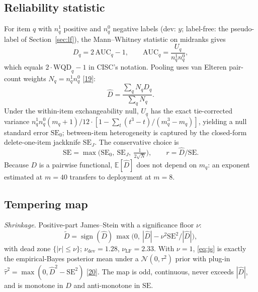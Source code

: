 \documentclass[conference]{IEEEtran}
\newcommand{\Dhat}{\widehat{D}}
\newcommand{\sign}{\operatorname{sign}}
\begin{document}
\subsection{Reliability statistic}
For item $q$ with $n^1_q$ positive and $n^0_q$ negative labels (dev: $y$; label-free: the pseudo-label of Section~\ref{sec:lf}), the Mann--Whitney statistic on midranks gives
\begin{equation}
D_q = 2\,\mathrm{AUC}_q-1,\qquad \mathrm{AUC}_q=\frac{U_q}{n^1_q n^0_q},
\end{equation}
which equals $2\cdot\mathrm{WQD}_q-1$ in CISC's notation. Pooling uses van Elteren pair-count weights $N_q=n^1_q n^0_q$ [\hyperlink{bib:vanelteren1960}{19}]:
\hypertarget{eq:pooled}{\,}
\begin{equation}
\Dhat=\frac{\sum_q N_q D_q}{\sum_q N_q}.
\end{equation}
Under the within-item exchangeability null, $U_q$ has the exact tie-corrected variance $n^1_qn^0_q(m_q{+}1)/12\cdot[1-\sum_t(t^3-t)/(m_q^3-m_q)]$, yielding a null standard error $\mathrm{SE}_0$; between-item heterogeneity is captured by the closed-form delete-one-item jackknife $\mathrm{SE}_J$. The conservative choice is
\begin{equation}
\mathrm{SE}=\max\big(\mathrm{SE}_0,\ \mathrm{SE}_J,\ \tfrac{1}{2\sqrt{N}}\big),\qquad r=\Dhat/\mathrm{SE}.
\end{equation}
Because $D$ is a pairwise functional, $\mathbb{E}[\Dhat]$ does not depend on $m_q$: an exponent estimated at $m{=}40$ transfers to deployment at $m{=}8$.

\subsection{Tempering map}
\emph{Shrinkage.} Positive-part James--Stein with a significance floor $\nu$:
\hypertarget{eq:js}{\,}
\begin{equation}
\tilde D=\sign(\Dhat)\,\max\!\big(0,\ |\Dhat|-\nu^2\mathrm{SE}^2/|\Dhat|\big),
\end{equation}
with dead zone $\{|r|\le\nu\}$; $\nu_{\mathrm{dev}}=1.28$, $\nu_{\mathrm{LF}}=2.33$. With $\nu=1$, \eqref{eq:js} is exactly the empirical-Bayes posterior mean under a $\mathcal{N}(0,\tau^2)$ prior with plug-in $\hat\tau^2=\max(0,\Dhat^2-\mathrm{SE}^2)$ [\hyperlink{bib:james1961estimation}{20}]. The map is odd, continuous, never exceeds $|\Dhat|$, and is monotone in $\Dhat$ and anti-monotone in $\mathrm{SE}$.
\end{document}
